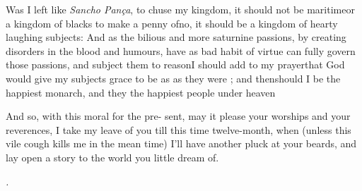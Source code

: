 \documentclass{article}
\begin{document}
Was I left like \textit{Sancho Pança}, to\break
chuse my kingdom, it should not be\break
maritime\tsk or a kingdom of blacks to make a penny of\tsh no, it should\break
be a kingdom of hearty laughing subjects: And as the bilious and more
sa\-turnine passions, by creating disorders\break
in the blood and humours, have as bad\break
{}
habit of virtue can fully govern those passions, and subject them to
reason\tsh I should add to my prayer\tsk that God would give
my subjects grace to be as  as they were
; and then\break should I be the happiest monarch,
and they the happiest people under heaven\tsk{}

And so, with this moral for the pre-\break
sent, may it please your worships and\break
your reverences, I take my leave of you\break
till this time twelve-month, when (unless\break
this vile cough kills me in the mean\break
time) I’ll have another pluck at your\break
beards, and lay open a story to the\break
world you little dream of.

\vskip 72pt
\centerline{\itshape{}.}
\end{document}
